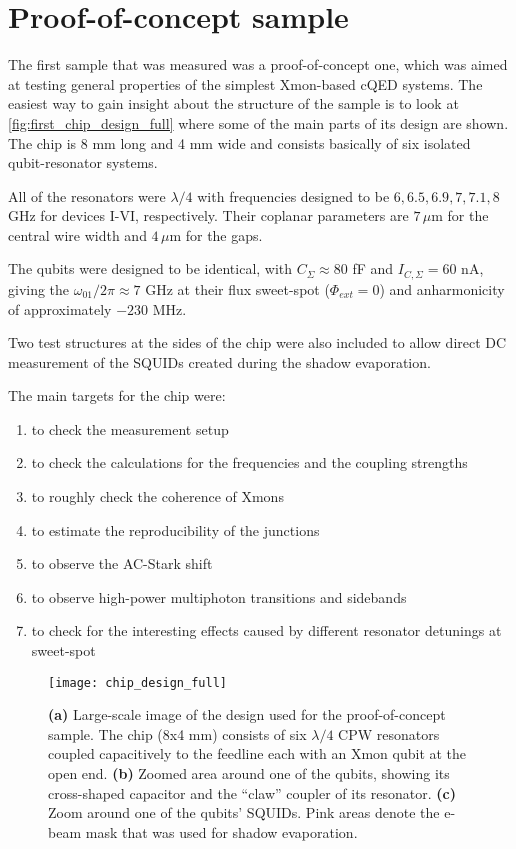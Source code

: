 \documentclass[12pt, twoside]{report}
\numberwithin{equation}{section}
\begin{document}
\section{Proof-of-concept sample}

The first sample that was measured was a proof-of-concept one, which was aimed at testing general properties of the simplest Xmon-based cQED systems. The easiest way to gain insight about the structure of the sample is to look at \autoref{fig:first_chip_design_full} where some of the main parts of its design are shown. The chip is 8 mm long and 4 mm wide and consists basically of six isolated qubit-resonator systems. 

All of the resonators were $\lambda/4$ with frequencies designed to be $6, 6.5, 6.9,7,7.1,8$ GHz for devices I-VI, respectively. Their coplanar parameters are $7\,\mu$m for the central wire width and $4\,\mu$m for the gaps.

The qubits were designed to be identical, with $C_\Sigma \approx 80$ fF and $I_{C, \Sigma} = 60$ nA, giving the $\omega_{01}/2\pi \approx 7$ GHz at their flux sweet-spot ($\Phi_{ext}=0$) and anharmonicity of approximately $-230$ MHz.

Two test structures at the sides of the chip were also included to allow direct DC measurement of the SQUIDs created during the shadow evaporation.

The main targets for the chip were:
\begin{enumerate}[label=(\alph*), leftmargin=1.5cm]
\itemsep0pt
 \item to check the measurement setup
 \item to check the calculations for the frequencies and the coupling strengths
 \item to roughly check the coherence of Xmons
 \item to estimate the reproducibility of the junctions 
 \item to observe the AC-Stark shift 
 \item to observe high-power multiphoton transitions and sidebands
 \item to check for the interesting effects caused by different resonator detunings at sweet-spot  
\end{enumerate}

\begin{figure}[h!]
\centering
\texttt{[image: chip\_design\_full]}
\caption{\textbf{(a)} Large-scale image of the design used for the proof-of-concept sample. The chip (8x4 mm) consists of six $\lambda/4$ CPW resonators coupled capacitively to the feedline each with an Xmon qubit at the open end. \textbf{(b)} Zoomed area around one of the qubits, showing its cross-shaped capacitor and the ``claw'' coupler of its resonator. \textbf{(c)} Zoom around one of the qubits' SQUIDs. Pink areas denote the e-beam mask that was used for shadow evaporation.}
\label{fig:first_chip_design_full}
\end{figure}
\end{document}

